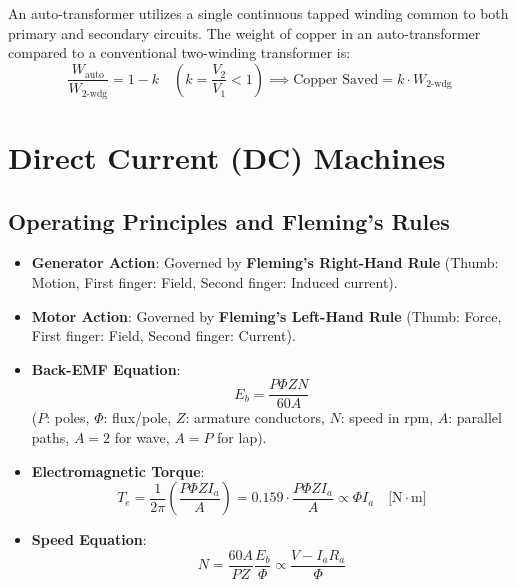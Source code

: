 \begin{definition}
An auto-transformer utilizes a single continuous tapped winding common to both primary and secondary circuits. The weight of copper in an auto-transformer compared to a conventional two-winding transformer is:
\begin{equation}
\frac{W_{\text{auto}}}{W_{\text{2-wdg}}} = 1 - k \quad \left(k = \frac{V_2}{V_1} < 1\right) \implies \text{Copper Saved} = k \cdot W_{\text{2-wdg}}
\end{equation}
\end{definition}

\section{Direct Current (DC) Machines}

\subsection{Operating Principles and Fleming's Rules}
\begin{itemize}[leftmargin=1.5em]
    \item \textbf{Generator Action}: Governed by \textbf{Fleming's Right-Hand Rule} (Thumb: Motion, First finger: Field, Second finger: Induced current).
    \item \textbf{Motor Action}: Governed by \textbf{Fleming's Left-Hand Rule} (Thumb: Force, First finger: Field, Second finger: Current).
    \item \textbf{Back-EMF Equation}:
    \begin{equation}
    E_b = \frac{P \Phi Z N}{60 A}
    \end{equation}
    ($P$: poles, $\Phi$: flux/pole, $Z$: armature conductors, $N$: speed in rpm, $A$: parallel paths, $A=2$ for wave, $A=P$ for lap).
    \item \textbf{Electromagnetic Torque}:
    \begin{equation}
    T_e = \frac{1}{2\pi} \left(\frac{P \Phi Z I_a}{A}\right) = 0.159 \cdot \frac{P \Phi Z I_a}{A} \propto \Phi I_a \quad \text{[N}\cdot\text{m]}
    \end{equation}
    \item \textbf{Speed Equation}:
    \begin{equation}
    N = \frac{60 A}{P Z} \frac{E_b}{\Phi} \propto \frac{V - I_a R_a}{\Phi}
    \end{equation}
\end{itemize}

